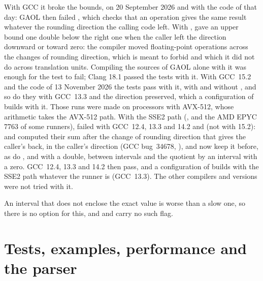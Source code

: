 \medskip
With GCC it broke the bounds, on 20 September 2026 and with the code of that
day: GAOL then failed , which checks that
an operation gives the same result whatever the rounding direction the calling
code left. With ,
 gave an upper bound one double below
the right one when the caller left the direction downward or toward zero: the
compiler moved floating-point operations across the changes of rounding
direction, which  is meant to forbid and which it did
not do across translation units. Compiling the sources of GAOL alone with it
was enough for the test to fail; Clang 18.1 passed the tests with it. With
GCC~15.2 and the code of 13 November 2026 the tests pass with it, with and
without , and so do they with GCC~13.3 and the
direction preserved, which a configuration of  builds with it.
Those runs were made on processors with AVX-512, whose arithmetic takes the
AVX-512 path. With the SSE2 path (, and the AMD
EPYC 7763 of some runners),  failed with GCC~12.4, 13.3 and
14.2 and  (not with 15.2):
 and  computed their sum
after the change of rounding direction that gives the caller's back, in the
caller's direction (GCC bug~34678, ), and now keep
it before, as do \code{*=}, \code{/=} and \code{\%=} with a double,
\code{\%=} between intervals and the quotient by an interval with a zero. GCC~12.4,
13.3 and 14.2 then pass, and a configuration of  builds with
the SSE2 path whatever the runner is (GCC~13.3). The other compilers and
versions were not tried with it.

\medskip
An interval that does not enclose the exact value is worse than a slow one, so
there is no option for this, and  and  carry no
such flag.

\section{Tests, examples, performance and the parser}\label{sec:tests}
%

